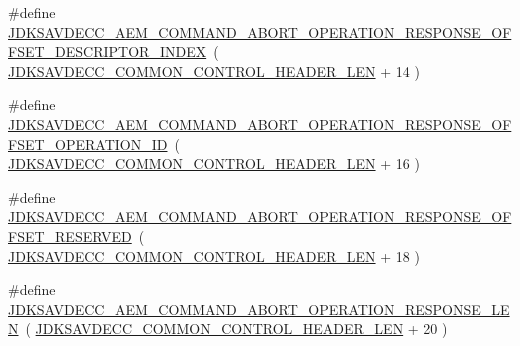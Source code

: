 \begin{DoxyCompactItemize}
\item 
\#define \hyperlink{group__command__abort__operation__response_ga760fbcf1bcbb5a6bb819c7017875a80c}{J\+D\+K\+S\+A\+V\+D\+E\+C\+C\+\_\+\+A\+E\+M\+\_\+\+C\+O\+M\+M\+A\+N\+D\+\_\+\+A\+B\+O\+R\+T\+\_\+\+O\+P\+E\+R\+A\+T\+I\+O\+N\+\_\+\+R\+E\+S\+P\+O\+N\+S\+E\+\_\+\+O\+F\+F\+S\+E\+T\+\_\+\+D\+E\+S\+C\+R\+I\+P\+T\+O\+R\+\_\+\+I\+N\+D\+EX}~( \hyperlink{group__jdksavdecc__avtp__common__control__header_gaae84052886fb1bb42f3bc5f85b741dff}{J\+D\+K\+S\+A\+V\+D\+E\+C\+C\+\_\+\+C\+O\+M\+M\+O\+N\+\_\+\+C\+O\+N\+T\+R\+O\+L\+\_\+\+H\+E\+A\+D\+E\+R\+\_\+\+L\+EN} + 14 )
\item 
\#define \hyperlink{group__command__abort__operation__response_ga9a6359f3096b1a2c866b9b1668a8ab40}{J\+D\+K\+S\+A\+V\+D\+E\+C\+C\+\_\+\+A\+E\+M\+\_\+\+C\+O\+M\+M\+A\+N\+D\+\_\+\+A\+B\+O\+R\+T\+\_\+\+O\+P\+E\+R\+A\+T\+I\+O\+N\+\_\+\+R\+E\+S\+P\+O\+N\+S\+E\+\_\+\+O\+F\+F\+S\+E\+T\+\_\+\+O\+P\+E\+R\+A\+T\+I\+O\+N\+\_\+\+ID}~( \hyperlink{group__jdksavdecc__avtp__common__control__header_gaae84052886fb1bb42f3bc5f85b741dff}{J\+D\+K\+S\+A\+V\+D\+E\+C\+C\+\_\+\+C\+O\+M\+M\+O\+N\+\_\+\+C\+O\+N\+T\+R\+O\+L\+\_\+\+H\+E\+A\+D\+E\+R\+\_\+\+L\+EN} + 16 )
\item 
\#define \hyperlink{group__command__abort__operation__response_gac3e4a3888366b112d4691f37e16c624d}{J\+D\+K\+S\+A\+V\+D\+E\+C\+C\+\_\+\+A\+E\+M\+\_\+\+C\+O\+M\+M\+A\+N\+D\+\_\+\+A\+B\+O\+R\+T\+\_\+\+O\+P\+E\+R\+A\+T\+I\+O\+N\+\_\+\+R\+E\+S\+P\+O\+N\+S\+E\+\_\+\+O\+F\+F\+S\+E\+T\+\_\+\+R\+E\+S\+E\+R\+V\+ED}~( \hyperlink{group__jdksavdecc__avtp__common__control__header_gaae84052886fb1bb42f3bc5f85b741dff}{J\+D\+K\+S\+A\+V\+D\+E\+C\+C\+\_\+\+C\+O\+M\+M\+O\+N\+\_\+\+C\+O\+N\+T\+R\+O\+L\+\_\+\+H\+E\+A\+D\+E\+R\+\_\+\+L\+EN} + 18 )
\item 
\#define \hyperlink{group__command__abort__operation__response_gace632e5fe0a6125328b3ca27ed1772b6}{J\+D\+K\+S\+A\+V\+D\+E\+C\+C\+\_\+\+A\+E\+M\+\_\+\+C\+O\+M\+M\+A\+N\+D\+\_\+\+A\+B\+O\+R\+T\+\_\+\+O\+P\+E\+R\+A\+T\+I\+O\+N\+\_\+\+R\+E\+S\+P\+O\+N\+S\+E\+\_\+\+L\+EN}~( \hyperlink{group__jdksavdecc__avtp__common__control__header_gaae84052886fb1bb42f3bc5f85b741dff}{J\+D\+K\+S\+A\+V\+D\+E\+C\+C\+\_\+\+C\+O\+M\+M\+O\+N\+\_\+\+C\+O\+N\+T\+R\+O\+L\+\_\+\+H\+E\+A\+D\+E\+R\+\_\+\+L\+EN} + 20 )
\end{DoxyCompactItemize}
